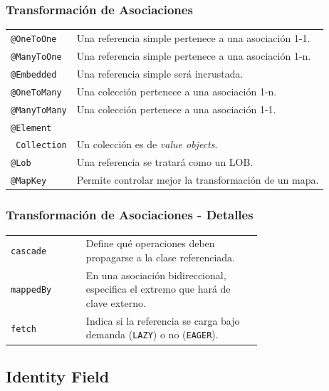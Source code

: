 \documentclass[handout,a4paper,slidestop,xcolor=pst,blue]{beamer}
\newcommand{\ann}[1]{\color{blue}\texttt{#1}\color{black}}
\begin{document}
\begin{frame}[c]
    \frametitle{Transformación de Asociaciones}
    \begin{tabular}{ll}
        \ann{@OneToOne}   & Una referencia simple pertenece a una asociación 1-1. \\
        \ann{@ManyToOne}  & Una referencia simple pertenece a una asociación 1-n. \\
        \ann{@Embedded}   & Una referencia simple será incrustada. \\
        \ann{@OneToMany}  & Una colección pertenece a una asociación 1-n. \\
        \ann{@ManyToMany} & Una colección pertenece a una asociación 1-1. \\
        \ann{@Element}    &  \\
        \multicolumn{1}{r}{\ann{Collection}} & Un colección es de \emph{value objects}. \\
        \ann{@Lob}        & Una referencia se tratará como un LOB. \\
        \ann{@MapKey}     & Permite controlar mejor la transformación de un mapa. \\
    \end{tabular}
\end{frame}

\begin{frame}[c]
    \frametitle{Transformación de Asociaciones - Detalles}
    \begin{tabular}{lp{0.70\linewidth}}
        \ann{cascade}  & Define qué operaciones deben propagarse a la clase referenciada. \\
        \ann{mappedBy} & En una asociación bidireccional, especifica el extremo que hará de clave externo. \\
        \ann{fetch}    & Indica si la referencia se carga bajo demanda (\ann{LAZY}) o no (\ann{EAGER}). \\
    \end{tabular}
\end{frame}

\subsection{Identity Field}
\end{document}
